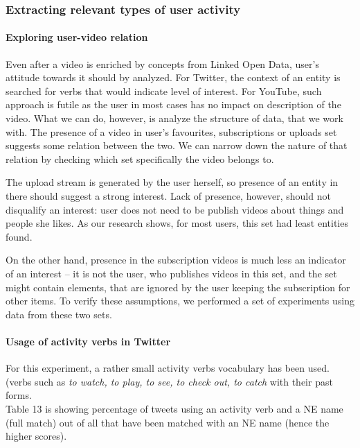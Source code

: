 \subsubsection{Extracting relevant types of user activity}

\paragraph{Exploring user-video relation} Even after a video is enriched by
concepts from Linked Open Data, user's attitude towards it should by analyzed.
For Twitter, the context of an entity is searched for verbs that would indicate
level of interest. For YouTube, such approach is futile as the user in most
cases has no impact on description of the video. What we can do, however, is
analyze the structure of data, that we work with. The presence of a video in
user's favourites, subscriptions or uploads set suggests some relation between
the two. We can narrow down the nature of that relation by checking which set
specifically the video belongs to.

The upload stream is generated by the user herself, so presence of an entity in
there should suggest a strong interest. Lack of presence, however, should not
disqualify an interest: user does not need to be publish videos about things
and people she likes. As our research shows, for most users, this set had least
entities found.

On the other hand, presence in the subscription videos is much less an
indicator of an interest -- it is not the user, who publishes videos in this
set, and the set might contain elements, that are ignored by the user keeping
the subscription for other items. To verify these assumptions, we performed a
set of experiments using data from these two sets.

\paragraph{Usage of activity verbs in Twitter}
For this experiment, a rather small activity verbs vocabulary has been used. (verbs such
as \textit{to watch, to play, to see, to check out, to catch} with their past forms.
\\ Table 13 is showing percentage of tweets using an activity verb
and a NE name (full match) out of all that have been matched with an
NE name (hence the higher scores).

